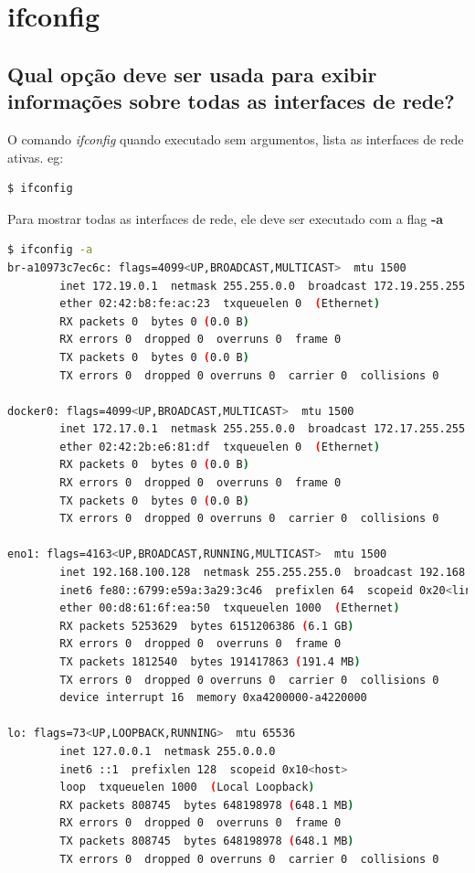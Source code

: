 \documentclass[12pt,a4paper]{report}
\begin{document}
\section{ifconfig}

\subsection{Qual opção deve ser usada para exibir informações sobre todas as interfaces de rede?}

O comando \emph{ifconfig} quando executado sem argumentos, lista as interfaces de rede ativas. eg:

\begin{lstlisting}[language=bash]
$ ifconfig
\end{lstlisting}

\noindent Para mostrar todas as interfaces de rede, ele deve ser executado com a flag \textbf{-a}

\begin{lstlisting}[language=bash]
$ ifconfig -a
br-a10973c7ec6c: flags=4099<UP,BROADCAST,MULTICAST>  mtu 1500
        inet 172.19.0.1  netmask 255.255.0.0  broadcast 172.19.255.255
        ether 02:42:b8:fe:ac:23  txqueuelen 0  (Ethernet)
        RX packets 0  bytes 0 (0.0 B)
        RX errors 0  dropped 0  overruns 0  frame 0
        TX packets 0  bytes 0 (0.0 B)
        TX errors 0  dropped 0 overruns 0  carrier 0  collisions 0

docker0: flags=4099<UP,BROADCAST,MULTICAST>  mtu 1500
        inet 172.17.0.1  netmask 255.255.0.0  broadcast 172.17.255.255
        ether 02:42:2b:e6:81:df  txqueuelen 0  (Ethernet)
        RX packets 0  bytes 0 (0.0 B)
        RX errors 0  dropped 0  overruns 0  frame 0
        TX packets 0  bytes 0 (0.0 B)
        TX errors 0  dropped 0 overruns 0  carrier 0  collisions 0

eno1: flags=4163<UP,BROADCAST,RUNNING,MULTICAST>  mtu 1500
        inet 192.168.100.128  netmask 255.255.255.0  broadcast 192.168.100.255
        inet6 fe80::6799:e59a:3a29:3c46  prefixlen 64  scopeid 0x20<link>
        ether 00:d8:61:6f:ea:50  txqueuelen 1000  (Ethernet)
        RX packets 5253629  bytes 6151206386 (6.1 GB)
        RX errors 0  dropped 0  overruns 0  frame 0
        TX packets 1812540  bytes 191417863 (191.4 MB)
        TX errors 0  dropped 0 overruns 0  carrier 0  collisions 0
        device interrupt 16  memory 0xa4200000-a4220000  

lo: flags=73<UP,LOOPBACK,RUNNING>  mtu 65536
        inet 127.0.0.1  netmask 255.0.0.0
        inet6 ::1  prefixlen 128  scopeid 0x10<host>
        loop  txqueuelen 1000  (Local Loopback)
        RX packets 808745  bytes 648198978 (648.1 MB)
        RX errors 0  dropped 0  overruns 0  frame 0
        TX packets 808745  bytes 648198978 (648.1 MB)
        TX errors 0  dropped 0 overruns 0  carrier 0  collisions 0    
\end{lstlisting}
\end{document}
